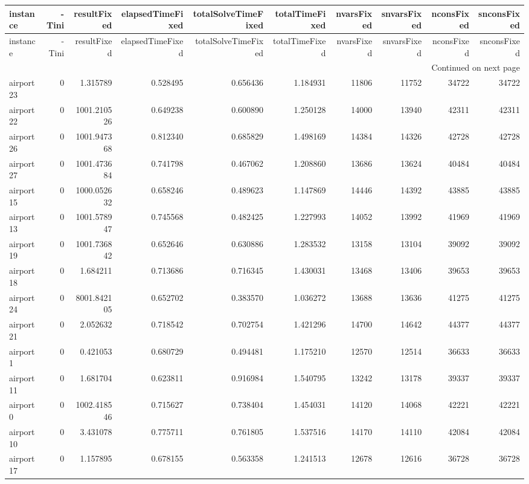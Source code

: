 \begin{longtable}{|l|r|r|r|r|r|r|r|r|r|}
\toprule
instance & -Tini & resultFixed & elapsedTimeFixed & totalSolveTimeFixed & totalTimeFixed & nvarsFixed & snvarsFixed & nconsFixed & snconsFixed \\
\midrule
\endfirsthead
\toprule
instance & -Tini & resultFixed & elapsedTimeFixed & totalSolveTimeFixed & totalTimeFixed & nvarsFixed & snvarsFixed & nconsFixed & snconsFixed \\
\midrule
\endhead
\midrule
\multicolumn{10}{r}{Continued on next page} \\
\midrule
\endfoot
\bottomrule
\endlastfoot
airport23 & 0 & 1.315789 & 0.528495 & 0.656436 & 1.184931 & 11806 & 11752 & 34722 & 34722 \\
airport22 & 0 & 1001.210526 & 0.649238 & 0.600890 & 1.250128 & 14000 & 13940 & 42311 & 42311 \\
airport26 & 0 & 1001.947368 & 0.812340 & 0.685829 & 1.498169 & 14384 & 14326 & 42728 & 42728 \\
airport27 & 0 & 1001.473684 & 0.741798 & 0.467062 & 1.208860 & 13686 & 13624 & 40484 & 40484 \\
airport15 & 0 & 1000.052632 & 0.658246 & 0.489623 & 1.147869 & 14446 & 14392 & 43885 & 43885 \\
airport13 & 0 & 1001.578947 & 0.745568 & 0.482425 & 1.227993 & 14052 & 13992 & 41969 & 41969 \\
airport19 & 0 & 1001.736842 & 0.652646 & 0.630886 & 1.283532 & 13158 & 13104 & 39092 & 39092 \\
airport18 & 0 & 1.684211 & 0.713686 & 0.716345 & 1.430031 & 13468 & 13406 & 39653 & 39653 \\
airport24 & 0 & 8001.842105 & 0.652702 & 0.383570 & 1.036272 & 13688 & 13636 & 41275 & 41275 \\
airport21 & 0 & 2.052632 & 0.718542 & 0.702754 & 1.421296 & 14700 & 14642 & 44377 & 44377 \\
airport1 & 0 & 0.421053 & 0.680729 & 0.494481 & 1.175210 & 12570 & 12514 & 36633 & 36633 \\
airport11 & 0 & 1.681704 & 0.623811 & 0.916984 & 1.540795 & 13242 & 13178 & 39337 & 39337 \\
airport0 & 0 & 1002.418546 & 0.715627 & 0.738404 & 1.454031 & 14120 & 14068 & 42221 & 42221 \\
airport10 & 0 & 3.431078 & 0.775711 & 0.761805 & 1.537516 & 14170 & 14110 & 42084 & 42084 \\
airport17 & 0 & 1.157895 & 0.678155 & 0.563358 & 1.241513 & 12678 & 12616 & 36728 & 36728 \\

\end{longtable}
